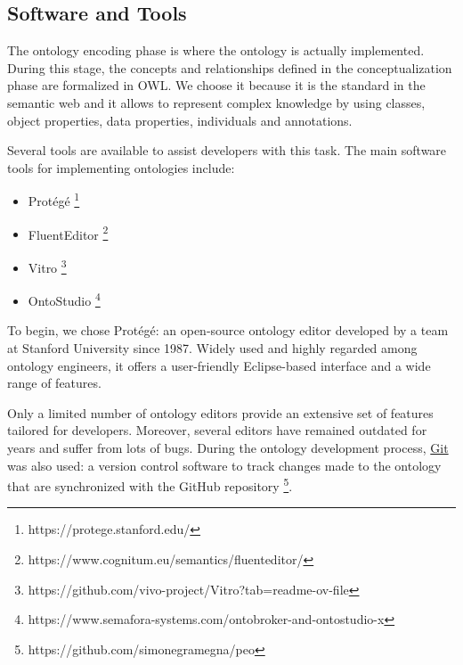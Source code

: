 \subsection{Software and Tools}
\label{subsection:4_3_1_software}
The ontology encoding phase is where the ontology is actually implemented.
During this stage, the concepts and relationships defined in the conceptualization phase are formalized in OWL. We choose it because it is the standard in the semantic web and it allows to represent complex knowledge by using classes, object properties, data properties, individuals and annotations.

Several tools are available to assist developers with this task.
The main software tools for implementing ontologies include:
\begin{itemize}
    \item Protégé \footnote{https://protege.stanford.edu/}
    \item FluentEditor \footnote{https://www.cognitum.eu/semantics/fluenteditor/}
    \item Vitro \footnote{https://github.com/vivo-project/Vitro?tab=readme-ov-file}
    \item OntoStudio \footnote{https://www.semafora-systems.com/ontobroker-and-ontostudio-x}
\end{itemize}
To begin, we chose Protégé: an open-source ontology editor developed by a team at Stanford University since 1987.
Widely used and highly regarded among ontology engineers, it offers a user-friendly Eclipse-based interface and a wide range of features.

Only a limited number of ontology editors provide an extensive set of features tailored for developers.
Moreover, several editors have remained outdated for years and suffer from lots of bugs.
During the ontology development process, \href{https://git-scm.com/}{Git} was also used: a version control software to track changes made to the ontology that are synchronized with the GitHub repository \footnote{https://github.com/simonegramegna/peo}.
